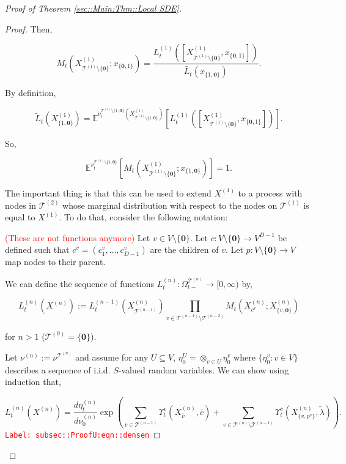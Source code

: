 \documentclass[12pt]{article}
\newcommand{\mb}{\mathbb}
\newcommand{\mc}{\mathcal}
\newcommand{\ra}{\rightarrow}
\newcommand{\ov}{\overline}
\newcommand{\tr}{\textcolor{red}}
\newcommand{\labe}[1]{\tr{\texttt{Label: #1}}}
\newcommand{\ind}{\hspace{24pt}}
\newcommand{\exmu}[2]{\mb{E}^{#1}\left[#2\right]}	%
\newcommand{\defeq}{:=}								%
\renewcommand{\root}{\mathbf{0}}				%
\renewcommand{\v}{v}							%
\renewcommand{\U}{U}							%
\renewcommand{\S}{S}							%
\newcommand{\x}{x}								%
\renewcommand{\t}{t}							%
\newcommand{\sset}{\Omega}						%
\newcommand{\X}{X}								%
\newcommand{\vind}[1]{^{#1}}					%
\newcommand{\vsi}[1]{^{#1}}						%
\newcommand{\cind}[1]{_{#1}}					%
\newcommand{\cl}{\ov}							%
\newcommand{\ts}[1]{_{#1}}						%
\newcommand{\degr}{D}							%
\newcommand{\IGrg}{\ov{c}}						%
\newcommand{\tree}{\mc{T}}						%
\newcommand{\sln}[1]{^{(#1)}}					%
\newcommand{\alt}[1]{\widetilde{#1}}			%
\newcommand{\mm}{\nu}							%
\newcommand{\mmm}{\eta}							%
\newcommand{\crate}{\alt{\lambda}}				%
\newcommand{\dense}{L}							%
\newcommand{\cdense}{M}							%
\newcommand{\ds}{\Upsilon}						%
\renewcommand{\c}{c}							%
\newcommand{\p}{p}								%
\begin{document}
\begin{proof}[Proof of Theorem \ref{sec::Main:Thm::Local SDE}]
\begin{proof}
Then,

\[\cdense\ts{\t}(\X\sln{1}\cind{\tree\sln{1}\setminus\{\root\}};\x\cind{\{\root,1\}}) = \frac{\dense\sln{1}\ts{\t}([\X\sln{1}\cind{\tree\sln{1}\setminus\{\root\}},\x\cind{\{\root,1\}}])}{\alt{\dense\ts{\t}}(\x\cind{\{1,\root\}})}.\]

By definition,

\[\alt{\dense}\ts{\t}(\X\sln{1}\cind{\{1,\root\}}) = \exmu{\mm\vind{\tree\sln{1}\setminus\{1,\root\}}\ts{\t}(\X\sln{1}\cind{\tree\sln{1}\setminus\{1,\root\}})}{\dense\sln{1}\ts{\t}([\X\sln{1}\cind{\tree\sln{1}\setminus\{\root\}},\x\cind{\{\root,1\}}])}.\]

So,

\[\exmu{\mm\vind{\tree\sln{1}\setminus\{1,\root\}}\ts{\t}}{\cdense\ts{\t}(\X\sln{1}\cind{\tree\sln{1}\setminus\{\root\}};\x\cind{\{1,\root\}})} = 1.\]

The important thing is that this can be used to extend \(\X\sln{1}\) to a process with nodes in \(\tree\sln{2}\) whose marginal distribution with respect to the nodes on \(\tree\sln{1}\) is equal to \(\X\sln{1}\). To do that, consider the following notation:

\ind \tr{(These are not functions anymore)} Let \(\v \in V\setminus\{\root\}\). Let \(\c:V\setminus\{\root\} \ra V^{\degr-1}\) be defined such that \(\c\vind{\v} = (\c\cind{1}\vind{\v},\dots,\c\cind{\degr-1}\vind{\v})\) are the children of \(\v\). Let \(\p:V\setminus\{\root\}\ra V\) map nodes to their parent.

\ind We can define the sequence of functions \(\dense\sln{n}\ts{\t}: \sset\vsi{\tree\sln{n}}\ts{\t-} \ra [0,\infty)\) by,

\[\dense\sln{n}\ts{\t}(\X\sln{n}) := \dense\sln{n-1}\ts{\t}(\X\sln{n}\cind{\tree\sln{n-1}})\prod_{\v\in \tree\sln{n-1}\setminus\tree\sln{n-2}} \cdense\ts{\t}(\X\sln{n}\cind{\c\vind{\v}};\X\sln{n}\cind{\{\v,\root\}})\]

for \(n > 1\) (\(\tree\sln{0} = \{\root\}\)). 

\ind Let \(\mm\sln{n}\defeq \mm\vind{\tree\sln{n}}\) and assume for any \(\U \subseteq V\), \(\mmm\vind{\U}\ts{0} = \otimes_{\v\in\U}\mmm\vind{\v}\ts{0}\) where \(\{\mmm\vind{\v}\ts{0}:\v\in V\}\) describes a sequence of i.i.d. \(\S\)-valued random variables. We can show using induction that,

\begin{equation}
\dense\sln{n}\ts{\t}(\X\sln{n}) = \frac{d\mmm\sln{n}\ts{\t}}{d\mm\sln{n}\ts{0}}\exp\left(\sum_{\v\in\tree\sln{n-1}}\ds\vind{\v}\ts{\t}(\X\sln{n}\cind{\cl{\v}},\IGrg{}) + \sum_{\v\in\tree\sln{n}\setminus\tree\sln{n-1}} \ds\vind{\v}\ts{\t}(\X\sln{n}\cind{\{v,\p\vind{\v}\}},\crate)\right).
\label{subsec::ProofU:eqn::densen}
\end{equation}
\labe{subsec::ProofU:eqn::densen}


\end{proof}
\end{proof}
\end{document}
